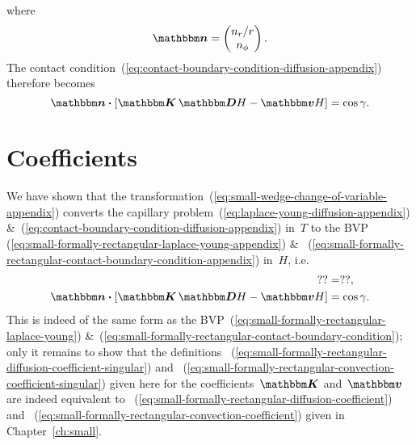 where
\begin{equation}
  \mat{n} =
    \begin{pmatrix}
      n_r / r \\
      n_\phi
    \end{pmatrix}.
  \label{eq:small-formally-rectangular-normal-matrix}
\end{equation}
The contact condition~(\ref{eq:contact-boundary-condition-diffusion-appendix})
therefore becomes
\begin{equation}
  \saveequation{
    \mat{n} \dotp \squarebr[\bulkysize]{\mat{K} \matder H - \mat{v} H}
  }{=}{
    \cos\gamma
  }{eq:small-formally-rectangular-contact-boundary-condition-appendix}.
\end{equation}

\section{Coefficients}
\label{sec:extraction.coefficients}

We have shown that
the transformation~(\ref{eq:small-wedge-change-of-variable-appendix})
converts the capillary problem~(\ref{eq:laplace-young-diffusion-appendix})
\&~(\ref{eq:contact-boundary-condition-diffusion-appendix})
in~$T$
to the BVP~%
  (\ref{eq:small-formally-rectangular-laplace-young-appendix})
\&~%
  (\ref{eq:small-formally-rectangular-contact-boundary-condition-appendix})
in~$H$,
i.e.
\begin{align}
  \useequation{&=}{eq:small-formally-rectangular-laplace-young-appendix},
    \label{eq:small-formally-rectangular-laplace-young-repeat} \\
  \useequation{&=}{%
    eq:small-formally-rectangular-contact-boundary-condition-appendix%
  }.
    \label{eq:small-formally-rectangular-contact-boundary-condition-repeat}
\end{align}
This is indeed of the same form
as the BVP~(\ref{eq:small-formally-rectangular-laplace-young})
\&~(\ref{eq:small-formally-rectangular-contact-boundary-condition});
only it remains to show that the definitions~%
  (\ref{eq:small-formally-rectangular-diffusion-coefficient-singular})
and~%
  (\ref{eq:small-formally-rectangular-convection-coefficient-singular})
given here for the coefficients~$\mat{K}$ and~$\mat{v}$
are indeed equivalent to~%
  (\ref{eq:small-formally-rectangular-diffusion-coefficient})
and~%
  (\ref{eq:small-formally-rectangular-convection-coefficient})
given in Chapter~\ref{ch:small}.

